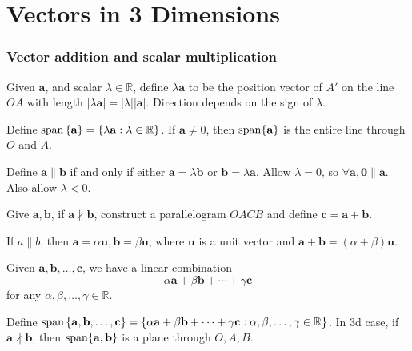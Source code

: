 \documentclass[10pt]{article}
\begin{document}
    \part{Vectors in 3 Dimensions}
    \section{Vector addition and scalar multiplication}
    \begin{definition}
        Given $ \mathbf{a} $, and scalar $ \lambda\in \mathbb{R} $, define $ \lambda \mathbf{a} $ to be the position vector of $ A' $ on the line $OA$ with length $ |\lambda \mathbf{a}|=\left| \lambda \right| \left| \mathbf{a} \right|  $. Direction depends on the sign of $ \lambda $.
    \end{definition}
    Define $ \operatorname{span}\left\{ \mathbf{a}\right\} = \left\{ \lambda \mathbf{a}: \lambda\in \mathbb{R} \right\} $. If $ \mathbf{a}\neq 0 $, then $ \operatorname{span} \{\mathbf{a}\} $ is the entire line through $O$ and $A$.

    Define $ \mathbf{a} \parallel \mathbf{b} $ if and only if either $ \mathbf{a} = \lambda \mathbf{b} $ or $ \mathbf{b} = \lambda \mathbf{a} $. Allow $ \lambda=0 $, so $\forall \mathbf{a}, \mathbf{0} \parallel \mathbf{a} $. Also allow $\lambda<0$.
    \begin{definition}
        Give $ \mathbf{a}, \mathbf{b} $, if $ \mathbf{a} \nparallel \mathbf{b} $, construct a parallelogram $OACB$ and define $ \mathbf{c} = \mathbf{a} + \mathbf{b} $.
    \end{definition}
    If $ a \parallel b $, then $ \mathbf{a} = \alpha \mathbf{u}, \mathbf{b}=\beta \mathbf{u} $, where $\mathbf{u}$ is a unit vector and $ \mathbf{a}+\mathbf{b}=(\alpha+\beta)\mathbf{u} $.

    Given $ \mathbf{a},\mathbf{b},\dots,\mathbf{c} $, we have a linear combination
    \[
        \alpha \mathbf{a}+ \beta \mathbf{b}+\cdots+\gamma \mathbf{c}
    \]
    for any $ \alpha,\beta,\dots, \gamma\in \mathbb{R}  $.

    Define $ \operatorname{span} \left\{ \mathbf{a},\mathbf{b},\dots,\mathbf{c}\right\} = \left\{ \alpha \mathbf{a}+ \beta \mathbf{b}+\cdots+\gamma \mathbf{c}:\alpha,\beta,\dots, \gamma\in \mathbb{R} \right\} $. In 3d case, if $ \mathbf{a} \nparallel \mathbf{b} $, then $ \operatorname{span} \{ \mathbf{a}, \mathbf{b} \} $ is a plane through $O,A,B$.
    
\end{document}
